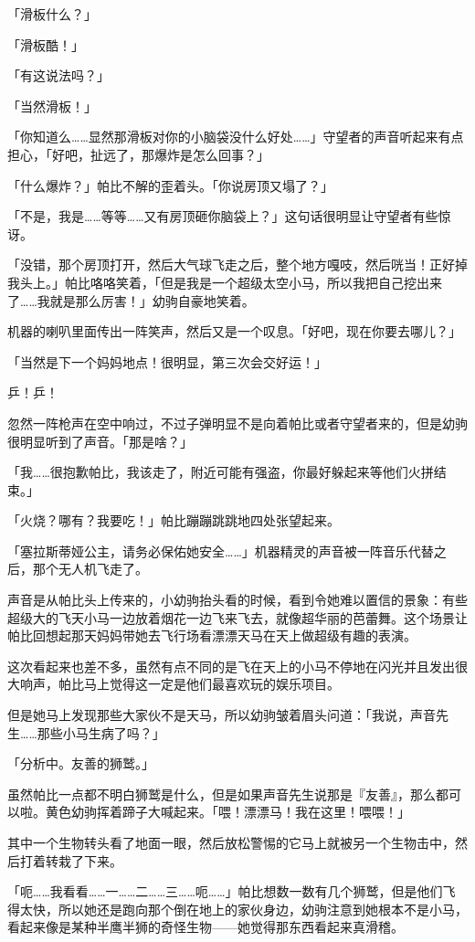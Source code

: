 「滑板什么？」

「滑板酷！」

「有这说法吗？」

「当然滑板！」

「你知道么……显然那滑板对你的小脑袋没什么好处……」守望者的声音听起来有点担心，「好吧，扯远了，那爆炸是怎么回事？」

「什么爆炸？」帕比不解的歪着头。「你说房顶又塌了？」

「不是，我是……等等……又有房顶砸你脑袋上？」这句话很明显让守望者有些惊讶。

「没错，那个房顶打开，然后大气球飞走之后，整个地方嘎吱，然后咣当！正好掉我头上。」帕比咯咯笑着，「但是我是一个超级太空小马，所以我把自己挖出来了……我就是那么厉害！」幼驹自豪地笑着。

机器的喇叭里面传出一阵笑声，然后又是一个叹息。「好吧，现在你要去哪儿？」

「当然是下一个妈妈地点！很明显，第三次会交好运！」

乒！乒！

忽然一阵枪声在空中响过，不过子弹明显不是向着帕比或者守望者来的，但是幼驹很明显听到了声音。「那是啥？」

「我……很抱歉帕比，我该走了，附近可能有强盗，你最好躲起来等他们火拼结束。」

「火烧？哪有？我要吃！」帕比蹦蹦跳跳地四处张望起来。

「塞拉斯蒂娅公主，请务必保佑她安全……」机器精灵的声音被一阵音乐代替之后，那个无人机飞走了。

声音是从帕比头上传来的，小幼驹抬头看的时候，看到令她难以置信的景象：有些超级大的飞天小马一边放着烟花一边飞来飞去，就像超华丽的芭蕾舞。这个场景让帕比回想起那天妈妈带她去飞行场看漂漂天马在天上做超级有趣的表演。

这次看起来也差不多，虽然有点不同的是飞在天上的小马不停地在闪光并且发出很大响声，帕比马上觉得这一定是他们最喜欢玩的娱乐项目。

但是她马上发现那些大家伙不是天马，所以幼驹皱着眉头问道：「我说，声音先生……那些小马生病了吗？」

「{\mt 分析中。友善的狮鹫。}」

虽然帕比一点都不明白狮鹫是什么，但是如果声音先生说那是『友善』，那么都可以啦。黄色幼驹挥着蹄子大喊起来。「喂！漂漂马！我在这里！喂喂！」

其中一个生物转头看了地面一眼，然后放松警惕的它马上就被另一个生物击中，然后打着转栽了下来。

「呃……我看看……一……二……三……呃……」帕比想数一数有几个狮鹫，但是他们飞得太快，所以她还是跑向那个倒在地上的家伙身边，幼驹注意到她根本不是小马，看起来像是某种半鹰半狮的奇怪生物——她觉得那东西看起来真滑稽。

